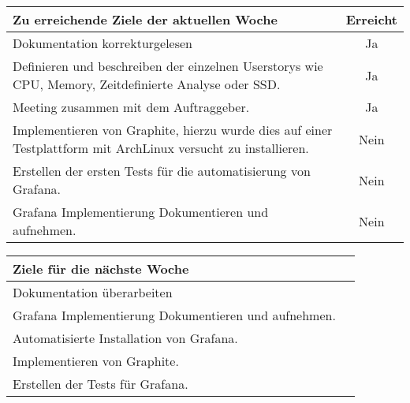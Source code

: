 \begin{tabularx}{\textwidth}{Xc}
    \arrayrulecolor{OliveGreen}
    \toprule
    {\bfseries Zu erreichende Ziele der aktuellen Woche} & {\bfseries Erreicht} \\
    \midrule[2pt]
    Dokumentation korrekturgelesen                          &Ja              \\
    \rowcolor{OliveGreen!15}
    Definieren und beschreiben der einzelnen Userstorys wie CPU, Memory,
    Zeitdefinierte Analyse oder SSD.             &Ja              \\
    \rowcolor{White}
    Meeting zusammen mit dem Auftraggeber.                   &Ja              \\
    \rowcolor{OliveGreen!15}
    Implementieren von Graphite, hierzu wurde dies auf einer Testplattform
    mit ArchLinux versucht zu installieren.               &Nein              \\
    \rowcolor{White}
    Erstellen der ersten Tests für die automatisierung von Grafana.  &Nein    \\
    \rowcolor{OliveGreen!15}
    Grafana Implementierung Dokumentieren und aufnehmen.   &Nein              \\
    \bottomrule[2pt]
\end{tabularx}
%
\vspace{1cm}
%
\begin{tabularx}{\textwidth}{Xc}
    \arrayrulecolor{OliveGreen}
    \toprule
    {\bfseries Ziele für die nächste Woche}        &                         \\
    \midrule[2pt]
    Dokumentation überarbeiten                     &                         \\
    \rowcolor{OliveGreen!15}
    Grafana Implementierung Dokumentieren und aufnehmen.   &                  \\
    \rowcolor{White}
    Automatisierte Installation von Grafana.        &                         \\
    \rowcolor{OliveGreen!15}
    Implementieren von Graphite.                   &                          \\
    \rowcolor{White}
    Erstellen der Tests für Grafana.               &                          \\
\end{tabularx}
